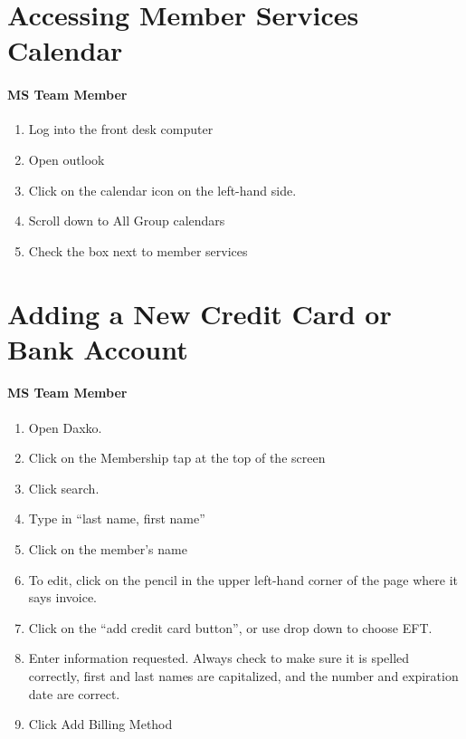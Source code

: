 \documentclass[
]{report}
\providecommand{\tightlist}{%
  \setlength{\itemsep}{0pt}\setlength{\parskip}{0pt}}\usepackage{longtable,booktabs,array}
\begin{document}
\hypertarget{accessing-member-services-calendar}{%
\chapter{Accessing Member Services
Calendar}\label{accessing-member-services-calendar}}

\hypertarget{ms-team-member-1}{%
\subsubsection{MS Team Member}\label{ms-team-member-1}}

\begin{enumerate}
\def\labelenumi{\arabic{enumi}.}
\tightlist
\item
  Log into the front desk computer
\item
  Open outlook
\item
  Click on the calendar icon on the left-hand side.
\item
  Scroll down to All Group calendars
\item
  Check the box next to member services
\end{enumerate}

\hypertarget{adding-a-new-credit-card-or-bank-account}{%
\chapter{Adding a New Credit Card or Bank
Account}\label{adding-a-new-credit-card-or-bank-account}}

\hypertarget{ms-team-member-2}{%
\subsubsection{MS Team Member}\label{ms-team-member-2}}

\begin{enumerate}
\def\labelenumi{\arabic{enumi}.}
\tightlist
\item
  Open Daxko.
\item
  Click on the Membership tap at the top of the screen
\item
  Click search.
\item
  Type in ``last name, first name''
\item
  Click on the member's name
\item
  To edit, click on the pencil in the upper left-hand corner of the page
  where it says invoice.
\item
  Click on the ``add credit card button'', or use drop down to choose
  EFT.
\item
  Enter information requested. Always check to make sure it is spelled
  correctly, first and last names are capitalized, and the number and
  expiration date are correct.
\item
  Click Add Billing Method
\end{enumerate}
\end{document}
